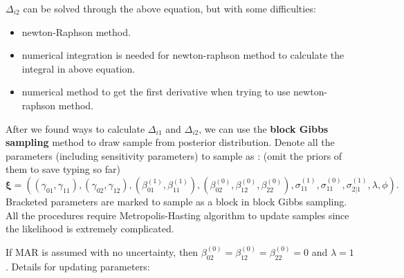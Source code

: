 \documentclass[12pt]{article}
\begin{document}
\begin{enumerate}
 $\Delta_{i2}$ can be solved through the above
  equation, but with some difficulties:
  \begin{itemize}
  \item newton-Raphson method.
  \item numerical integration is needed for newton-raphson method to
    calculate the integral in above equation.
  \item numerical method to get the first derivative when trying to
    use newton-raphson method.
  \end{itemize}
\end{enumerate}

After we found ways to calculate $\Delta_{i1}$ and $\Delta_{i2}$, we
can use the \textbf{block Gibbs sampling} method to draw sample from
posterior distribution. Denote all the parameters (including
sensitivity parameters) to sample as : (omit the priors of them to
save typing so far)
\begin{displaymath}
  \bm \xi = \left( (\gamma_{01}, \gamma_{11}),
    (\gamma_{02}, \gamma_{12}), (\beta_{01}^{(1)}, \beta_{11}^{(1)}),
    (\beta_{02}^{(0)}, \beta_{12}^{(0)}, \beta_{22}^{(0)}),
    \sigma_{11}^{(1)}, \sigma_{11}^{(0)}, \sigma_{2|1}^{(1)}, \lambda,
    \phi \right).
\end{displaymath}
Bracketed parameters are marked to sample as a block in block Gibbs
sampling.  All the procedures require Metropolis-Hasting algorithm to
update samples since the likelihood is extremely complicated.

If MAR is assumed with no uncertainty, then $\beta_{02}^{(0)} =
\beta_{12}^{(0)} = \beta_{22}^{(0)} = 0$ and $\lambda = 1$. Details
for updating parameters:
\end{document}
